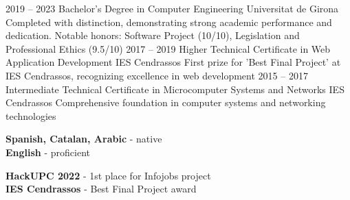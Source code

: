 \documentclass[9pt]{developercv} %
\begin{document}

\begin{entrylist}
	\entry
		{2019 -- 2023}
		{Bachelor's Degree in Computer Engineering}
		{Universitat de Girona}
		{Completed with distinction, demonstrating strong academic performance and dedication. Notable honors: Software Project (10/10), Legislation and Professional Ethics (9.5/10)}
	\entry
		{2017 -- 2019}
		{Higher Technical Certificate in Web Application Development}
		{IES Cendrassos}
		{First prize for 'Best Final Project' at IES Cendrassos, recognizing excellence in web development}
	\entry
		{2015 -- 2017}
		{Intermediate Technical Certificate in Microcomputer Systems and Networks}
		{IES Cendrassos}
		{Comprehensive foundation in computer systems and networking technologies}
\end{entrylist}


\begin{minipage}[t]{0.45\textwidth} %
	\vspace{-\baselineskip} %

	
	\textbf{Spanish, Catalan, Arabic} - native\\
	\textbf{English} - proficient
\end{minipage}
\hfill %
\begin{minipage}[t]{0.45\textwidth} %
	\vspace{-\baselineskip} %
	
	
	\textbf{HackUPC 2022} - 1st place for Infojobs project\\
	\textbf{IES Cendrassos} - Best Final Project award
\end{minipage}

\end{document}
